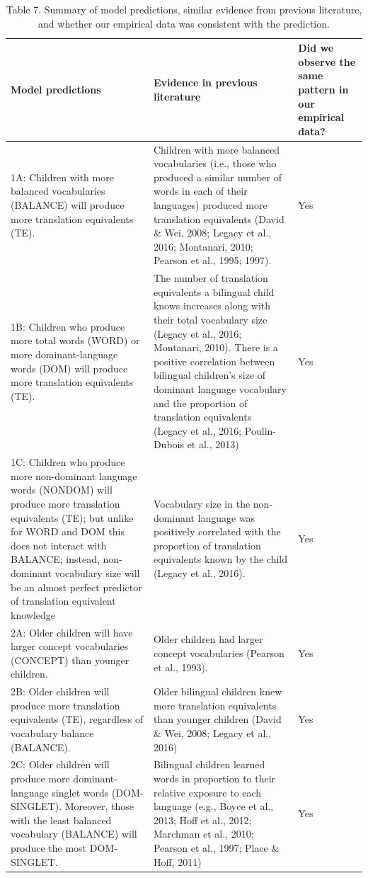 \documentclass[
  english,
  ,man,floatsintext]{apa6}
\begin{document}
\begin{landscape}
\begin{table}
\caption{\label{tab:table7}Table 7. Summary of model predictions, similar evidence from previous literature, and whether our empirical data was consistent with the prediction.}
\centering
\fontsize{7}{9}\selectfont
\begin{tabular}[t]{>{\raggedright\arraybackslash}p{200px}>{\raggedright\arraybackslash}p{250px}>{\centering\arraybackslash}p{150px}}
\toprule
Model predictions & Evidence in previous literature & Did we observe the same pattern in our empirical data?\\
\midrule
1A: Children with more balanced vocabularies (BALANCE) will produce more translation equivalents (TE). & Children with more balanced vocabularies (i.e., those who produced a similar number of words in each of their languages) produced more translation equivalents (David \& Wei, 2008; Legacy et al., 2016; Montanari, 2010; Pearson et al., 1995; 1997). & Yes\\
1B: Children who produce more total words (WORD) or more dominant-language words (DOM) will produce more translation equivalents (TE). & The number of translation equivalents a bilingual child knows increases along with their total vocabulary size (Legacy et al., 2016; Montanari, 2010). 
 There is a positive correlation between bilingual children’s size of dominant language vocabulary and the proportion of translation equivalents (Legacy et al., 2016; Poulin-Dubois et al., 2013) & Yes\\
1C: Children who produce more non-dominant language words (NONDOM) will produce more translation equivalents (TE); but unlike for WORD and DOM this does not interact with BALANCE; instead, non-dominant vocabulary size will be an almost perfect predictor of translation equivalent knowledge & Vocabulary size in the non-dominant language was positively correlated with the proportion of translation equivalents known by the child (Legacy et al., 2016). & Yes\\
2A: Older children will have larger concept vocabularies (CONCEPT) than younger children. & Older children had larger concept vocabularies (Pearson et al., 1993). & Yes\\
2B: Older children will produce more translation equivalents (TE), regardless of vocabulary balance (BALANCE). & Older bilingual children knew more translation equivalents than younger children  (David \& Wei, 2008; Legacy et al., 2016) & Yes\\
\addlinespace
2C: Older children will produce more dominant-language singlet words (DOM-SINGLET). Moreover, those with the least balanced vocabulary (BALANCE) will produce the most DOM-SINGLET. & Bilingual children learned words in proportion to their relative exposure to each language (e.g., Boyce et al., 2013; Hoff et al., 2012; Marchman et al., 2010; Pearson et al., 1997; Place \& Hoff, 2011) & Yes\\

\end{tabular}
\end{table}
\end{landscape}
\end{document}
